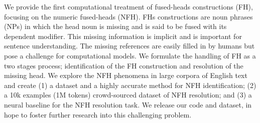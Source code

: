We provide the first computational treatment of fused-heads constructions (FH), focusing on the numeric fused-heads (NFH). FHs constructions are noun phrases (NPs) in which the head noun is missing and is said to be fused with its dependent modifier. This missing information is implicit and is important for sentence understanding. The missing references are easily filled in by humans but pose a challenge for computational models. We formulate the handling of FH as a two stages process; identification of the FH construction and resolution of the missing head. We explore the NFH phenomena in large corpora of English text and create (1) a dataset and a highly accurate method for NFH identification; (2) a 10k examples (1M tokens) crowd-sourced dataset of NFH resolution; and (3) a neural baseline for the NFH resolution task. We release our code and dataset, in hope to foster further research into this challenging problem.